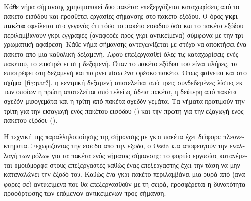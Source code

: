 \begin{greek}
Κάθε νήμα σήμανσης χρησιμοποιεί δύο πακέτα: επεξεργάζεται
καταχωρίσεις από το πακέτο εισόδου και προσθέτει εργασίες 
σήμανσης στο πακέτο εξόδου. Ο όρος \textbf{γκρι πακέτα} οφείλεται 
στο γεγονός ότι τόσο το πακέτο εισόδου όσο και το πακέτο εξόδου
περιλαμβάνουν γκρι εγγραφές (αναφορές προς γκρι αντικείμενα)
σύμφωνα με την τριχρωματική αφαίρεση. Κάθε νήμα σήμανσης ανταγωνίζεται
με στόχο να αποκτήσει ένα πακέτο από μια καθολική δεξαμενή.
Αφού επεξεργασθεί όλες τις καταχωρίσεις ενός πακέτου, το επιστρέφει
στη δεξαμενή. Όταν το πακέτο εξόδου του είναι πλήρες, το επιστρέφει
στη δεξαμενή και παίρνει πίσω ένα φρέσκο πακέτο. Όπως φαίνεται
και στο σχήμα~\ref{fig:par2}, η κεντρική δεξαμενή αποτελείται
από τρεις συνδεδεμένες λίστες εκ των οποίων η πρώτη αποτελείται
από τελείως άδεια πακέτα, η δεύτερη από πακέτα σχεδόν μισογεμάτα
και η τρίτη από πακέτα σχεδόν γεμάτα. Τα νήματα προτιμούν την
τρίτη για την εισαγωγή ενός πακέτου εισόδου ()
και την πρώτη για την εξαγωγή ενός πακέτου εξόδου ().

Η τεχνική της παραλληλοποίησης της σήμανσης με γκρι πακέτα έχει
διάφορα πλεονεκτήματα. Ξεχωρίζοντας την είσοδο από την έξοδο,
ο Ossia κ.ά αποφεύγουν την εναλλαγή των ρόλων για τα πακέτα
ενός νήματος σήμανσης: το φορτίο εργασίας κατανέμεται ομοιόμορφα
στους επεξεργαστές καθώς ένας επεξεργαστής έχει την τάση να μην
καταναλώνει την έξοδό του. Καθώς ένα γκρι πακέτο περιλαμβάνει
μια ουρά από (αναφορές σε) αντικείμενα που θα επεξεργασθούν με
τη σειρά, προσφέρεται η δυνατότητα προφόρτωσης των επόμενων
αντικειμένων προς σήμανση.


\end{greek}

